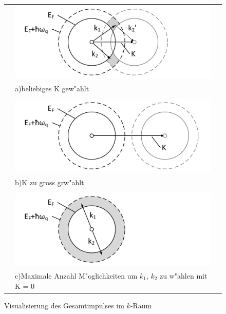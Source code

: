 \begin{refsection}
\begin{figure}
\centering
  \begin{tabular}{l l l}
  \centering
    &
    \begin{minipage}{0.6\textwidth}
	\includegraphics[width=1.2\textwidth]{supraleitung/Graphics/kGraphic05g.pdf}
    \end{minipage}
    &
    \\
    &
    a)\quad beliebiges K gew"ahlt 			%
    \\
    &
    \\
    &
    \begin{minipage}{0.6\textwidth}
	\includegraphics[width=1.2\textwidth]{supraleitung/Graphics/kGraphic06g.pdf} 
    \end{minipage}
    &
    \\
    &
    b)\quad K zu gross grw"ahlt							%
    \\
    &
    \\
    &
    \begin{minipage}{0.6\textwidth}
	\includegraphics[width=1.2\textwidth]{supraleitung/Graphics/kGraphic09g.pdf}
    \end{minipage}
    &
    \\
    &
    c)\quad Maximale Anzahl M"oglichkeiten um $k_1$, $k_2$ zu w"ahlen mit K = 0 	%
    &
    \\
  \end{tabular}
  \caption{Visualisierung des Gesamtimpulses im $k$-Raum
  \label{supraleitung:kRaum}}
\end{figure}


\end{refsection}
